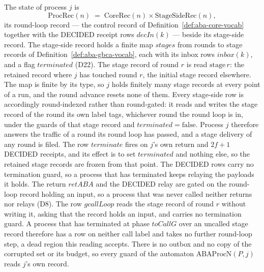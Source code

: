 \begin{definition}
  \label{def:aba-procnet}
  \leanok
  The state of process $j$ is
  \[
    \mathrm{ProcRec}(n) \;=\;
      \mathrm{CoreRec}(n) \times \mathrm{StageSideRec}(n),
  \]
  its round-loop record --- the control record of Definition~\ref{def:aba-core-vocab} together with the DECIDED receipt rows $decIn(k)$ --- beside its stage-side record.
  The stage-side record holds a finite map $stages$ from rounds to stage records of Definition~\ref{def:aba-gbca-vocab}, each with its inbox rows $inbox(k)$, and a flag $terminated$ (D22).
  The stage record of round $r$ is read $\mathrm{stage}\,r$: the retained record where $j$ has touched round $r$, the initial stage record elsewhere.
  The map is finite by its type, so $j$ holds finitely many stage records at every point of a run, and the round advance resets none of them.
  Every stage-side row is accordingly round-indexed rather than round-gated: it reads and writes the stage record of the round its own label tags, whichever round the round loop is in, under the guards of that stage record and $terminated = \mathrm{false}$.
  Process $j$ therefore answers the traffic of a round its round loop has passed, and a stage delivery of any round is filed.
  The row $terminate$ fires on $j$'s own return and $2f+1$ DECIDED receipts, and its effect is to set $terminated$ and nothing else, so the retained stage records are frozen from that point.
  The DECIDED rows carry no termination guard, so a process that has terminated keeps relaying the payloads it holds.
  The return $retABA$ and the DECIDED relay are gated on the round-loop record holding an input, so a process that was never called neither returns nor relays (D8).
  The row $gcallLoop$ reads the stage record of round $r$ without writing it, asking that the record holds an input, and carries no termination guard.
  A process that has terminated at phase $toCallG$ over an uncalled stage record therefore has a row on neither call label and takes no further round-loop step, a dead region this reading accepts.
  There is no outbox and no copy of the corrupted set or its budget, so every guard of the automaton $\mathrm{ABAProcN}(P,j)$ reads $j$'s own record.

\end{definition}
